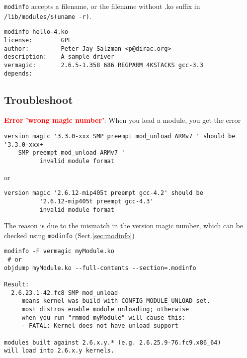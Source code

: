 \verb!modinfo! accepts a filename, or the filename without .ko suffix in
\verb!/lib/modules/$(uname -r)!.

\begin{verbatim}
modinfo hello-4.ko 
license:        GPL
author:         Peter Jay Salzman <p@dirac.org>
description:    A sample driver
vermagic:       2.6.5-1.358 686 REGPARM 4KSTACKS gcc-3.3
depends:        

\end{verbatim}

\subsection{Troubleshoot}

\textcolor{red}{\bf Error 'wrong magic number'}:
When you load a module, you get the error
\begin{verbatim}
version magic '3.3.0-xxx SMP preempt mod_unload ARMv7 ' should be '3.3.0-xxx+
    SMP preempt mod_unload ARMv7 '
          invalid module format    
\end{verbatim}
or
\begin{verbatim}
version magic '2.6.12-mip405t preempt gcc-4.2' should be
          '2.6.12-mip405t preempt gcc-4.3'          
          invalid module format
\end{verbatim}

The reason is due to the mismatch in the version magic number, which can be
checked using \verb!modinfo! (Sect.\ref{sec:modinfo})

\begin{verbatim}
modinfo -F vermagic myModule.ko
 # or
objdump myModule.ko --full-contents --section=.modinfo
  
Result:  
  2.6.23.1-42.fc8 SMP mod_unload 
     means kernel was build with CONFIG_MODULE_UNLOAD set.
     most distros enable module unloading; otherwise
     when you run "rmmod myModule" will cause this:
     - FATAL: Kernel does not have unload support
     
modules built against 2.6.x.y.* (e.g. 2.6.25.9-76.fc9.x86_64)
will load into 2.6.x.y kernels.          
\end{verbatim}
 
